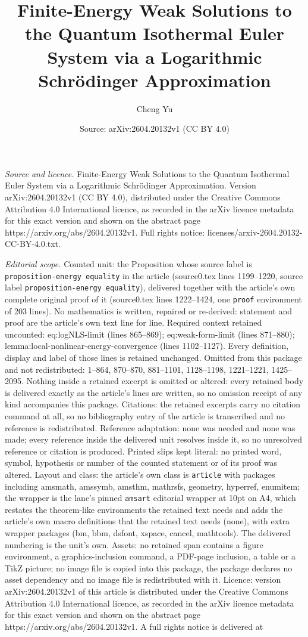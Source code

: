 \documentclass[10pt,a4paper]{amsart}
\title[Finite-Energy Weak Solutions to the Quantum Isothermal Euler]{Finite-Energy Weak Solutions to the Quantum Isothermal Euler System via a Logarithmic Schr\"odinger Approximation}
\author{Cheng Yu}
\date{Source: arXiv:2604.20132v1 (CC BY 4.0)}
\begin{document}
\maketitle

\noindent\emph{Source and licence.} Finite-Energy Weak Solutions to the Quantum Isothermal Euler System via a Logarithmic Schr\"odinger Approximation. Version arXiv:2604.20132v1 (CC BY 4.0), distributed under the Creative Commons Attribution 4.0 International licence, as recorded in the arXiv licence metadata for this exact version and shown on the abstract page https://arxiv.org/abs/2604.20132v1. Full rights notice: licenses/arxiv-2604.20132-CC-BY-4.0.txt.\par\smallskip

\noindent\textit{Editorial scope.} Counted unit: the Proposition whose source label is \texttt{proposition-energy equality} in the article (source0.tex lines 1199--1220, source label \texttt{proposition-energy equality}), delivered together with the article's own complete original proof of it (source0.tex lines 1222--1424, one \texttt{proof} environment of 203 lines). No mathematics is written, repaired or re-derived: statement and proof are the article's own text line for line. Required context retained uncounted: eq:logNLS-limit (lines 865--869); eq:weak-form-limit (lines 871--880); lemma:local-nonlinear-energy-convergence (lines 1102--1127). Every definition, display and label of those lines is retained unchanged. Omitted from this package and not redistributed: 1--864, 870--870, 881--1101, 1128--1198, 1221--1221, 1425--2095. Nothing inside a retained excerpt is omitted or altered: every retained body is delivered exactly as the article's lines are written, so no omission receipt of any kind accompanies this package. Citations: the retained excerpts carry no citation command at all, so no bibliography entry of the article is transcribed and no reference is redistributed. Reference adaptation: none was needed and none was made; every reference inside the delivered unit resolves inside it, so no unresolved reference or citation is produced. Printed slips kept literal: no printed word, symbol, hypothesis or number of the counted statement or of its proof was altered. Layout and class: the article's own class is \texttt{article} with packages including amsmath, amssymb, amsthm, mathrsfs, geometry, hyperref, enumitem; the wrapper is the lane's pinned \texttt{amsart} editorial wrapper at 10pt on A4, which restates the theorem-like environments the retained text needs and adds the article's own macro definitions that the retained text needs (none), with extra wrapper packages (bm, bbm, dsfont, xspace, cancel, mathtools). The delivered numbering is the unit's own. Assets: no retained span contains a figure environment, a graphics-inclusion command, a PDF-page inclusion, a table or a TikZ picture; no image file is copied into this package, the package declares no asset dependency and no image file is redistributed with it. Licence: version arXiv:2604.20132v1 of this article is distributed under the Creative Commons Attribution 4.0 International licence, as recorded in the arXiv licence metadata for this exact version and shown on the abstract page https://arxiv.org/abs/2604.20132v1. A full rights notice is delivered at 
\end{document}
